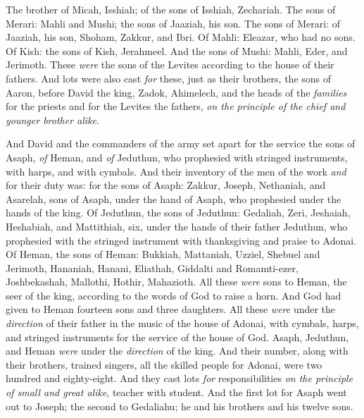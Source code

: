 \begin{biblechapter}
\verse The brother of Micah, Isshiah; of the sons of Isshiah, Zechariah.
\verse The sons of Merari: Mahli and Mushi; the sons of Jaaziah, his son.
\verse The sons of Merari: of Jaaziah, his son, Shoham, Zakkur, and Ibri.
\verse Of Mahli: Eleazar, who had no sons.
\verse Of Kish: the sons of Kish, Jerahmeel.
\verse And the sons of Mushi: Mahli, Eder, and Jerimoth. These \textit{were} the sons of the Levites according to the house of their fathers.
\verse And lots were also cast \textit{for} these, just as their brothers, the sons of Aaron, before David the king, Zadok, Ahimelech, and the heads of the \textit{families} for the priests and for the Levites the fathers, \textit{on the principle of the chief and younger brother alike}.
\end{biblechapter}

\begin{biblechapter} %
 And David and the commanders of the army set apart for the service the sons of Asaph, \textit{of} Heman, and \textit{of} Jeduthun, who prophesied with stringed instruments, with harps, and with cymbals. And their inventory of the men of the work \textit{and} for their duty was:
\verse for the sons of Asaph: Zakkur, Joseph, Nethaniah, and Asarelah, sons of Asaph, under the hand of Asaph, who prophesied under the hands of the king.
\verse Of Jeduthun, the sons of Jeduthun: Gedaliah, Zeri, Jeshaiah, Heshabiah, and Mattithiah, six, under the hands of their father Jeduthun, who prophesied with the stringed instrument with thanksgiving and praise to Adonai.
\verse Of Heman, the sons of Heman: Bukkiah, Mattaniah, Uzziel, Shebuel and Jerimoth, Hananiah, Hanani, Eliathah, Giddalti and Romamti-ezer, Joshbekashah, Mallothi, Hothir, Mahazioth.
\verse All these \textit{were} sons to Heman, the seer of the king, according to the words of God to raise a horn. And God had given to Heman fourteen sons and three daughters.
\verse All these \textit{were} under the \textit{direction} of their father in the music of the house of Adonai, with cymbals, harps, and stringed instruments for the service of the house of God. Asaph, Jeduthun, and Heman \textit{were} under the \textit{direction} of the king.
\verse And their number, along with their brothers, trained singers, all the skilled people for Adonai, were two hundred and eighty-eight.
\verse And they cast lots \textit{for} responsibilities \textit{on the principle of small and great alike}, teacher with student.
\verse And the first lot for Asaph went out to Joseph; the second to Gedaliahu; he and his brothers and his twelve sons.

\end{biblechapter}
